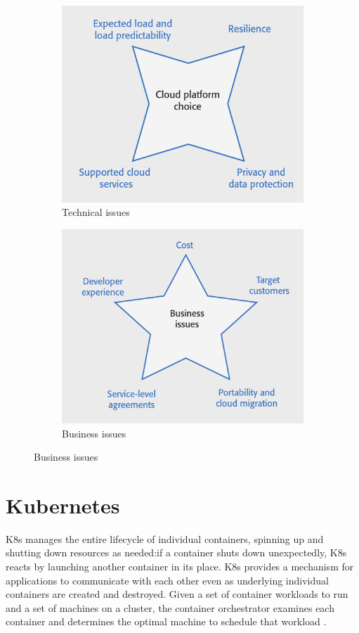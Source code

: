 \documentclass[10pt,a4paper]{report}
\begin{document}
\begin{figure}
	\centering
	\begin{subfigure}{.5\textwidth}
		\centering
		\includegraphics[width=.9\linewidth]{image58}
		\caption{Technical issues}
		\label{image58}
	\end{subfigure}%
	\begin{subfigure}{.5\textwidth}
		\centering
		\includegraphics[width=.9\linewidth]{image59}
		\caption{Business issues}
		\label{image59}
	\end{subfigure}
	
	\label{image59a}
\end{figure}

\section{Kubernetes}
K8s manages the entire lifecycle of individual containers, spinning up and shutting down resources as needed:if a container shuts down unexpectedly, K8s reacts by launching another container in its place.
K8s provides a mechanism for applications to communicate with each other even as underlying individual containers are created and destroyed. Given a set of container workloads to run and a set of machines on a cluster, the container orchestrator examines each container and determines the optimal machine to schedule that workload .
\end{document}
